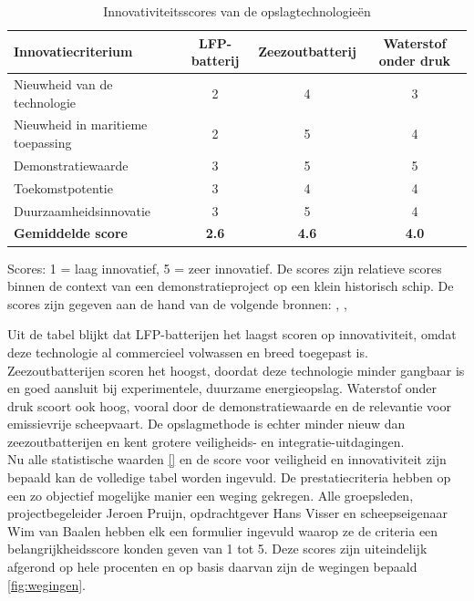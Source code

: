 \begin{table}[H]
\centering
\caption{Innovativiteitsscores van de opslagtechnologieën}
\label{tab:innovativiteit_scores}
\renewcommand{\arraystretch}{1.25}
\begin{tabular}{l c c c}
\hline
\textbf{Innovatiecriterium} 
& \textbf{LFP-batterij} 
& \textbf{Zeezoutbatterij} 
& \textbf{Waterstof onder druk} \\
\hline
Nieuwheid van de technologie & 2 & 4 & 3 \\
Nieuwheid in maritieme toepassing & 2 & 5 & 4 \\
Demonstratiewaarde & 3 & 5 & 5 \\
Toekomstpotentie & 3 & 4 & 4 \\
Duurzaamheidsinnovatie & 3 & 5 & 4 \\
\hline
\textbf{Gemiddelde score} & \textbf{2.6} & \textbf{4.6} & \textbf{4.0} \\
\hline
\end{tabular}

\vspace{0.2cm}
\footnotesize{Scores: 1 = laag innovatief, 5 = zeer innovatief. De scores zijn relatieve scores binnen de context van een demonstratieproject op een klein historisch schip. De scores zijn gegeven aan de hand van de volgende bronnen: \cite{iea2024batteries}, \cite{irena2025sodium}, \cite{emsa2023hydrogen}}
\end{table}


\noindent Uit de tabel blijkt dat LFP-batterijen het laagst scoren op innovativiteit, omdat deze technologie al commercieel volwassen en breed toegepast is. Zeezoutbatterijen scoren het hoogst, doordat deze technologie minder gangbaar is en goed aansluit bij experimentele, duurzame energieopslag. Waterstof onder druk scoort ook hoog, vooral door de demonstratiewaarde en de relevantie voor emissievrije scheepvaart. De opslagmethode is echter minder nieuw dan zeezoutbatterijen en kent grotere veiligheids- en integratie-uitdagingen.\\

\noindent Nu alle statistische waarden \ref{} en de score voor veiligheid en innovativiteit zijn bepaald kan de volledige tabel worden ingevuld. De prestatiecriteria hebben op een zo objectief mogelijke manier een weging gekregen. Alle groepsleden, projectbegeleider Jeroen Pruijn, opdrachtgever Hans Visser en scheepseigenaar Wim van Baalen hebben elk een formulier ingevuld waarop ze de criteria een belangrijkheidsscore konden geven van 1 tot 5. Deze scores zijn uiteindelijk afgerond op hele procenten en op basis daarvan zijn de wegingen bepaald \ref{fig:wegingen}.

